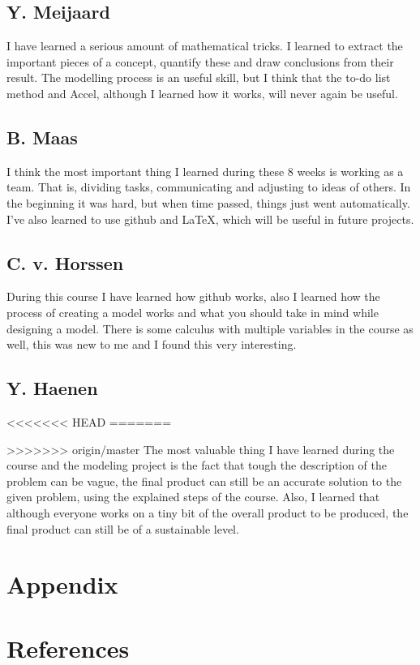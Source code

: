 \documentclass[a4paper, 11pt, notitlepage]{report}
\begin{document}
	\section*{Y. Meijaard}
	I have learned a serious amount of mathematical tricks. I learned to extract the important pieces of a concept, quantify these and draw conclusions from their result. The modelling process is an useful skill, but I think that the to-do list method and Accel, although I learned how it works, will never again be useful.
	
	\section*{B. Maas}
	I think the most important thing I learned during these 8 weeks is working as a team. That is, dividing tasks, communicating and adjusting to ideas of others. In the beginning it was hard, but when time passed, things just went automatically. I've also learned to use github and LaTeX, which will be useful in future projects.

\section*{C. v. Horssen} During this course I have learned how github works, also I learned how the process of creating a model works and what you should take in mind while designing a model. There is some calculus with multiple variables in the course as well, this was new to me and I found this very interesting.

\section*{Y. Haenen}
<<<<<<< HEAD
=======

>>>>>>> origin/master
The most valuable thing I have learned during the course and the modeling project is the fact that tough the description of the problem can be vague, the final product can still be an accurate solution to the given problem, using the explained steps of the course. Also, I learned that although everyone works on a tiny bit of the overall product to be produced, the final product can still be of a sustainable level.

\chapter*{Appendix}
\chapter{References}
\end{document}
